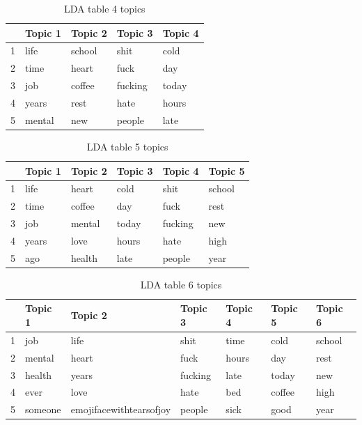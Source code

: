 \documentclass{article}
\begin{document}
\begin{table}[htb]
\caption{LDA table 4 topics}
\label{LDA table 4 topics}
\centering
\begin{tabular}{rllll}
  \hline
 & Topic 1 & Topic 2 & Topic 3 & Topic 4 \\ 
  \hline
1 & life & school & shit & cold \\ 
  2 & time & heart & fuck & day \\ 
  3 & job & coffee & fucking & today \\ 
  4 & years & rest & hate & hours \\ 
  5 & mental & new & people & late \\ 
   \hline
\end{tabular}
\end{table}

\begin{table}[htb]
\caption{LDA table 5 topics}
\label{LDA table 5 topics}
\centering
\begin{tabular}{rlllll}
  \hline
 & Topic 1 & Topic 2 & Topic 3 & Topic 4 & Topic 5 \\ 
  \hline
1 & life & heart & cold & shit & school \\ 
  2 & time & coffee & day & fuck & rest \\ 
  3 & job & mental & today & fucking & new \\ 
  4 & years & love & hours & hate & high \\ 
  5 & ago & health & late & people & year \\ 
   \hline
\end{tabular}
\end{table}

\begin{table}[htb]
\caption{LDA table 6 topics}
\label{LDA table 6 topics}
\centering
\begin{tabular}{rllllll}
  \hline
 & Topic 1 & Topic 2 & Topic 3 & Topic 4 & Topic 5 & Topic 6 \\ 
  \hline
1 & job & life & shit & time & cold & school \\ 
  2 & mental & heart & fuck & hours & day & rest \\ 
  3 & health & years & fucking & late & today & new \\ 
  4 & ever & love & hate & bed & coffee & high \\ 
  5 & someone & emojifacewithtearsofjoy & people & sick & good & year \\ 
   \hline
\end{tabular}
\end{table}
\end{document}
